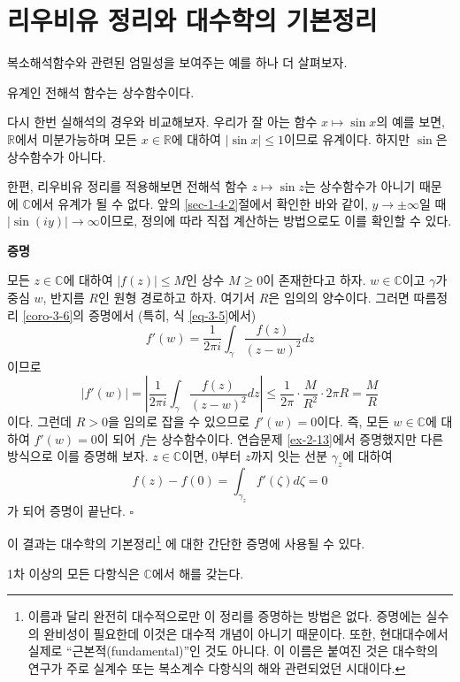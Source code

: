 \section{리우비유 정리와 대수학의 기본정리}

복소해석함수와 관련된 엄밀성을 보여주는 예를 하나 더 살펴보자.

\begin{salttheorem}{}{} \label{thm-3-7}
유계인 전해석 함수는 상수함수이다.
\end{salttheorem}

다시 한번 실해석의 경우와 비교해보자.
우리가 잘 아는 함수 $x\mapsto \sin x$의 예를 보면,
$\mathbb R$에서 미분가능하며
모든 $x\in\mathbb R$에 대하여 $|\sin x|\le 1$이므로 
유계이다.
하지만 $\sin$은 상수함수가 아니다.

한편, 리우비유 정리를 적용해보면
전해석 함수 $z\mapsto \sin z$는 상수함수가 아니기 때문에
$\mathbb C$에서 유계가 될 수 없다.
앞의 \ref{sec-1-4-2}절에서 확인한 바와 같이,
$y\to\pm\infty$일 때 $|\sin(iy)| \to \infty$이므로,
정의에 따라 직접 계산하는 방법으로도 이를 확인할 수 있다.

{\bf 증명}

모든 $z\in \mathbb C$에 대하여 $|f(z)|\le M$인
상수 $M\ge0$이 존재한다고 하자.
$w\in\mathbb C$이고 $\gamma$가 중심 $w$, 반지름 $R$인 원형 경로하고 하자. 
여기서 $R$은 임의의 양수이다.
그러면 따름정리 \ref{coro-3-6}의 증명에서 (특히, 식 \eqref{eq-3-5}에서)
\[
f'(w) = \dfrac1{2\pi i} \int_\gamma \dfrac{f(z)}{(z-w)^2}dz
\]
이므로
\[
|f'(w)| = \left| \dfrac1{2\pi i} \int_\gamma \dfrac{f(z)}{(z-w)^2}dz \right|
\le \dfrac1{2\pi}\cdot \dfrac M{R^2}\cdot 2\pi R = \dfrac MR
\]
이다.
그런데 $R>0$을 임의로 잡을 수 있으므로 $f'(w)=0$이다.
즉, 모든 $w\in\mathbb C$에 대하여 $f'(w)=0$이 되어 $f$는 상수함수이다.
연습문제 \ref{ex-2-13}에서 증명했지만 다른 방식으로 이를 증명해 보자.
$z\in\mathbb C$이면, $0$부터 $z$까지 잇는 선분 $\gamma_z$에 대하여
\[
f(z) - f(0) = \int_{\gamma_z} f'(\zeta)d\zeta = 0
\]
가 되어 증명이 끝난다.
\hfill $\square$

이 결과는 대수학의 기본정리\footnote{
이름과 달리 완전히 대수적으로만 이 정리를 증명하는 방법은 없다.
증명에는 실수의 완비성이 필요한데 이것은 대수적 개념이 아니기 때문이다.
또한, 현대대수에서 실제로 ``근본적(fundamental)''인 것도 아니다.
이 이름은 붙여진 것은 대수학의 연구가 주로 실계수 또는 복소계수 다항식의 해와 관련되었던
시대이다.}
에 대한 간단한 증명에 사용될 수 있다.

\begin{salt_corollary}  \label{coro-3-7}
1차 이상의 모든 다항식은 $\mathbb C$에서 해를 갖는다.
\end{salt_corollary}

